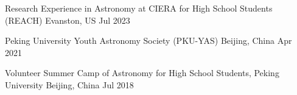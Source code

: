 \begin{cventries}

{Research Experience in Astronomy at CIERA for High School Students (REACH)}
{Evanston, US}
{Jul 2023}
{}

{Peking University Youth Astronomy Society (PKU-YAS)}
{Beijing, China}
{Apr 2021}
{}


\cventry
{Volunteer} %
{Summer Camp of Astronomy for High School Students, Peking University} %
{Beijing, China} %
{Jul 2018} %
{ %
}




{ %
}

\end{cventries}